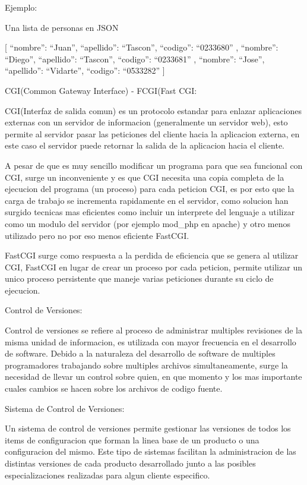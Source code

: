Ejemplo:

Una lista de personas en JSON

[
 { ``nombre'': ``Juan'', ``apellido'': ``Tascon'', ``codigo'': ``0233680'' },
 { ``nombre'': ``Diego'', ``apellido'': ``Tascon'', ``codigo'': ``0233681'' },
 { ``nombre'': ``Jose'', ``apellido'': ``Vidarte'', ``codigo'': ``0533282'' }
]


CGI(Common Gateway Interface) - FCGI(Fast CGI:

CGI(Interfaz de salida comun) es un protocolo estandar para enlazar aplicaciones externas con un servidor de informacion (generalmente un servidor web), esto permite al servidor pasar las peticiones del cliente hacia la aplicacion externa, en este caso el servidor puede retornar la salida de la aplicacion hacia el cliente.


A pesar de que es muy sencillo modificar un programa para que sea funcional con CGI, surge un inconveniente y es que CGI necesita una copia completa de la ejecucion del programa (un proceso) para cada peticion CGI, es por esto que la carga de trabajo se incrementa rapidamente en el servidor, como solucion han surgido tecnicas mas eficientes como incluir un interprete del lenguaje a utilizar como un modulo del servidor (por ejemplo mod\_php en apache) y otro menos utilizado pero no por eso menos eficiente FastCGI.


FastCGI surge como respuesta a la perdida de eficiencia que se genera al utilizar CGI, FastCGI en lugar de crear un proceso por cada peticion, permite utilizar un unico proceso persistente que maneje varias peticiones durante su ciclo de ejecucion.


Control de Versiones:

Control de versiones se refiere al proceso de administrar multiples revisiones de la misma unidad de informacion, es utilizada con mayor frecuencia en el desarrollo de software.
Debido a la naturaleza del desarrollo de software de multiples programadores trabajando sobre multiples archivos simultaneamente, surge la necesidad de llevar un control sobre quien, en que momento y los mas importante cuales cambios se hacen sobre los archivos de codigo fuente.


Sistema de Control de Versiones:

Un sistema de control de versiones permite gestionar las versiones de todos los items de configuracion que forman la linea base de un producto o una configuracion del mismo. Este tipo de sistemas facilitan la administracion de las distintas versiones de cada producto desarrollado junto a las posibles especializaciones realizadas para algun cliente especifico.

